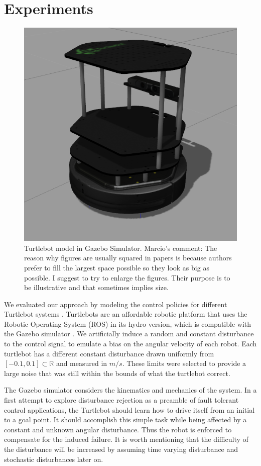 \documentclass{aamas2016}
\renewcommand{\Re}{\mathbb{R}}
\begin{document}
\section{Experiments} \label{Experiments}

\begin{figure}[!htbp]
    \centering
        \includegraphics[width=.45\textwidth]{images/turtlebotsim_crop.png}
        \caption{Turtlebot model in Gazebo Simulator. {\color{red} Marcio's comment: The reason why figures are usually squared in papers
        is because authors prefer to fill the largest space possible so they look as big as possible. I suggest to try to enlarge the figures.
        Their purpose is to be illustrative and that sometimes implies size.}}\label{fig:gazebo}
\end{figure}

We evaluated our approach by modeling the control policies for different Turtlebot systems \cite{Turtlebot-2016}.
Turtlebots are an affordable robotic platform that uses the Robotic Operating System (ROS) in its hydro version,
which is compatible with the Gazebo simulator \cite{Gazebo-2016,ROS-2016}. We artificially induce a random and
constant disturbance to the control signal to emulate a bias on the angular velocity of each robot. 
Each turtlebot has a different constant disturbance drawn uniformly from 
$[-0.1, 0.1] \subset \Re$ and measured in $m/s$. These limits were selected to provide a large noise that was still within the bounds of what the turtlebot correct. 

The Gazebo simulator considers the kinematics and mechanics of the system. In a first attempt to explore disturbance rejection as a preamble of
fault tolerant control applications, the Turtlebot should learn how to drive itself from an initial to a goal point.
It should accomplish this simple task while being affected by a constant and unknown angular disturbance. Thus the robot is enforced to
compensate for the induced failure. It is worth mentioning that the difficulty of the disturbance will be increased by assuming
time varying disturbance and stochastic disturbances later on.
\end{document}
